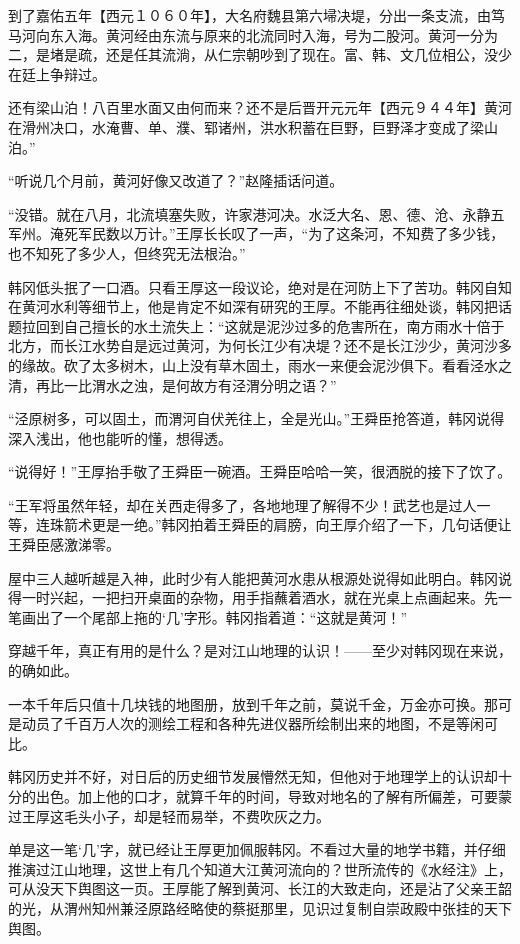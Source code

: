 到了嘉佑五年【西元１０６０年】，大名府魏县第六埽决堤，分出一条支流，由笃马河向东入海。黄河经由东流与原来的北流同时入海，号为二股河。黄河一分为二，是堵是疏，还是任其流淌，从仁宗朝吵到了现在。富、韩、文几位相公，没少在廷上争辩过。

还有梁山泊！八百里水面又由何而来？还不是后晋开元元年【西元９４４年】黄河在滑州决口，水淹曹、单、濮、郓诸州，洪水积蓄在巨野，巨野泽才变成了梁山泊。”

“听说几个月前，黄河好像又改道了？”赵隆插话问道。

“没错。就在八月，北流填塞失败，许家港河决。水泛大名、恩、德、沧、永静五军州。淹死军民数以万计。”王厚长长叹了一声，“为了这条河，不知费了多少钱，也不知死了多少人，但终究无法根治。”

韩冈低头抿了一口酒。只看王厚这一段议论，绝对是在河防上下了苦功。韩冈自知在黄河水利等细节上，他是肯定不如深有研究的王厚。不能再往细处谈，韩冈把话题拉回到自己擅长的水土流失上：“这就是泥沙过多的危害所在，南方雨水十倍于北方，而长江水势自是远过黄河，为何长江少有决堤？还不是长江沙少，黄河沙多的缘故。砍了太多树木，山上没有草木固土，雨水一来便会泥沙俱下。看看泾水之清，再比一比渭水之浊，是何故方有泾渭分明之语？”

“泾原树多，可以固土，而渭河自伏羌往上，全是光山。”王舜臣抢答道，韩冈说得深入浅出，他也能听的懂，想得透。

“说得好！”王厚抬手敬了王舜臣一碗酒。王舜臣哈哈一笑，很洒脱的接下了饮了。

“王军将虽然年轻，却在关西走得多了，各地地理了解得不少！武艺也是过人一等，连珠箭术更是一绝。”韩冈拍着王舜臣的肩膀，向王厚介绍了一下，几句话便让王舜臣感激涕零。

屋中三人越听越是入神，此时少有人能把黄河水患从根源处说得如此明白。韩冈说得一时兴起，一把扫开桌面的杂物，用手指蘸着酒水，就在光桌上点画起来。先一笔画出了一个尾部上拖的‘几’字形。韩冈指着道：“这就是黄河！”

穿越千年，真正有用的是什么？是对江山地理的认识！——至少对韩冈现在来说，的确如此。

一本千年后只值十几块钱的地图册，放到千年之前，莫说千金，万金亦可换。那可是动员了千百万人次的测绘工程和各种先进仪器所绘制出来的地图，不是等闲可比。

韩冈历史并不好，对日后的历史细节发展懵然无知，但他对于地理学上的认识却十分的出色。加上他的口才，就算千年的时间，导致对地名的了解有所偏差，可要蒙过王厚这毛头小子，却是轻而易举，不费吹灰之力。

单是这一笔‘几’字，就已经让王厚更加佩服韩冈。不看过大量的地学书籍，并仔细推演过江山地理，这世上有几个知道大江黄河流向的？世所流传的《水经注》上，可从没天下舆图这一页。王厚能了解到黄河、长江的大致走向，还是沾了父亲王韶的光，从渭州知州兼泾原路经略使的蔡挺那里，见识过复制自崇政殿中张挂的天下舆图。

